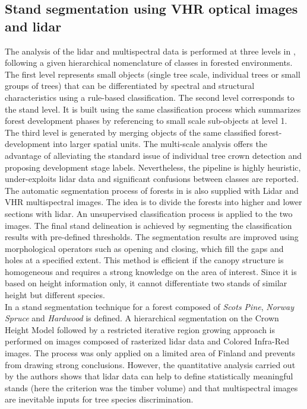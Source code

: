\subsection{Stand segmentation using VHR optical images and lidar}
The analysis of the lidar and multispectral data is performed at three levels in \citep{tiede2004object}, following a given hierarchical nomenclature of classes in forested environments. The first level represents small objects (single tree scale, individual trees or small groups of trees) that can be differentiated by spectral and structural characteristics using a rule-based classification. The second level corresponds to the stand level. It is built using the same classification process which summarizes forest development phases by referencing to small scale sub-objects at level 1. The third level is generated by merging objects of the same classified forest-development into larger spatial units. The multi-scale analysis offers the advantage of alleviating the standard issue of individual tree crown detection and proposing development stage labels. Nevertheless, the pipeline is highly heuristic, under-exploits lidar data and significant confusions between classes are reported.\\
The automatic segmentation process of forests in \citep{diedershagen2004automatic} is also supplied with Lidar and VHR multispectral images. The idea is to divide the forests into higher and lower sections with lidar. An unsupervised classification process is applied to the two images. The final stand delineation is achieved by segmenting the classification results with pre-defined thresholds. The segmentation results are improved using morphological operators such as opening and closing, which fill the gaps and holes at a specified extent. This method is efficient if the canopy structure is homogeneous and requires a strong knowledge on the area of interest. Since it is based on height information only, it cannot differentiate two stands of similar height but different species.\\
In \citep{leppanen2008automatic} a stand segmentation technique for a forest composed of \textit{Scots Pine}, \textit{Norway Spruce} and \textit{Hardwood} is defined. A hierarchical segmentation on the Crown Height Model followed by a restricted iterative region growing approach is performed on images composed of rasterized lidar data and Colored Infra-Red images. The process was only applied on a limited area of Finland and prevents from drawing strong conclusions. However, the quantitative analysis carried out by the authors shows that lidar data can help to define statistically meaningful stands (here the criterion was the timber volume) and that multispectral images are inevitable inputs for tree species discrimination. \\

